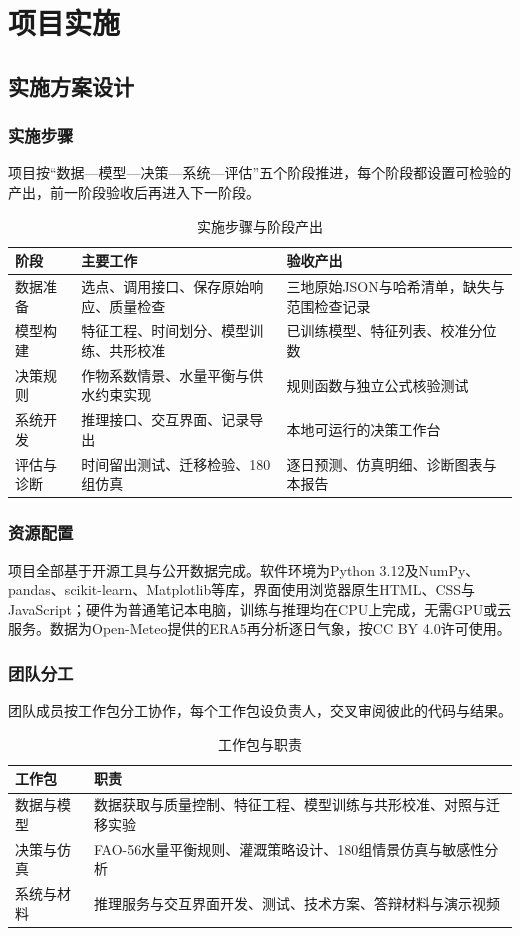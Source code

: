 \section{项目实施}
\subsection{实施方案设计}
\subsubsection{实施步骤}
项目按“数据—模型—决策—系统—评估”五个阶段推进，每个阶段都设置可检验的产出，前一阶段验收后再进入下一阶段。

\begin{table}[H]\centering\small
\caption{实施步骤与阶段产出}\label{tab:plan}
\begin{tabularx}{\linewidth}{@{}p{.15\linewidth}XX@{}}\toprule
阶段 & 主要工作 & 验收产出\\\midrule
数据准备 & 选点、调用接口、保存原始响应、质量检查 & 三地原始JSON与哈希清单，缺失与范围检查记录\\
模型构建 & 特征工程、时间划分、模型训练、共形校准 & 已训练模型、特征列表、校准分位数\\
决策规则 & 作物系数情景、水量平衡与供水约束实现 & 规则函数与独立公式核验测试\\
系统开发 & 推理接口、交互界面、记录导出 & 本地可运行的决策工作台\\
评估与诊断 & 时间留出测试、迁移检验、180组仿真 & 逐日预测、仿真明细、诊断图表与本报告\\\bottomrule
\end{tabularx}
\end{table}

\subsubsection{资源配置}
项目全部基于开源工具与公开数据完成。软件环境为Python 3.12及NumPy、pandas、scikit-learn、Matplotlib等库，界面使用浏览器原生HTML、CSS与JavaScript；硬件为普通笔记本电脑，训练与推理均在CPU上完成，无需GPU或云服务。数据为Open-Meteo提供的ERA5再分析逐日气象，按CC BY 4.0许可使用\cite{license}。

\subsubsection{团队分工}
团队成员按工作包分工协作，每个工作包设负责人，交叉审阅彼此的代码与结果。

\begin{table}[H]\centering\small
\caption{工作包与职责}\label{tab:team}
\begin{tabularx}{\linewidth}{@{}p{.20\linewidth}X@{}}\toprule
工作包 & 职责\\\midrule
数据与模型 & 数据获取与质量控制、特征工程、模型训练与共形校准、对照与迁移实验\\
决策与仿真 & FAO-56水量平衡规则、灌溉策略设计、180组情景仿真与敏感性分析\\
系统与材料 & 推理服务与交互界面开发、测试、技术方案、答辩材料与演示视频\\\bottomrule
\end{tabularx}
\end{table}

